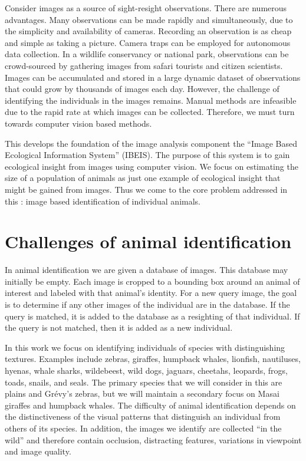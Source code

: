     Consider images as a source of sight-resight observations. There are numerous advantages. Many observations can
    be made rapidly and simultaneously, due to the simplicity and availability of cameras. Recording an observation
    is as cheap and simple as taking a picture. Camera traps can be employed for autonomous data collection. In a
    wildlife conservancy or national park, observations can be crowd-sourced by gathering images from safari
    tourists and citizen scientists. Images can be accumulated and stored in a large dynamic dataset of
    observations that could grow by thousands of images each day. However, the challenge of identifying the
    individuals in the images remains. Manual methods are infeasible due to the rapid rate at which images can be
    collected. Therefore, we must turn towards computer vision based methods.

    This \thesis{} develops the foundation of the image analysis component the ``Image Based Ecological Information
    System'' (IBEIS). The purpose of this system is to gain ecological insight from images using computer vision.
    We focus on estimating the size of a population of animals as just one example of ecological insight that might
    be gained from images. Thus we come to the core problem addressed in this \thesis{}: image based identification
    of individual animals.

\section{Challenges of animal identification}\label{sec:challenges}

    In animal identification we are given a database of images.
    This database may initially be empty.
    Each image is cropped to a bounding box around an animal of interest and labeled with that animal's identity.
    For a new query image, the goal is to determine if any other images of the individual are in the database.
    If the query is matched, it is added to the database as a resighting of that individual.
    If the query is not matched, then it is added as a new individual.

    In this work we focus on identifying individuals of species with distinguishing textures. Examples include
    zebras, giraffes, humpback whales, lionfish, nautiluses, hyenas, whale sharks, wildebeest, wild dogs, jaguars,
    cheetahs, leopards, frogs, toads, snails, and seals. The primary species that we will consider in this
    \thesis{} are plains and Grévy's zebras, but we will maintain a secondary focus on Masai giraffes and humpback
    whales. The difficulty of animal identification depends on the distinctiveness of the visual patterns that
    distinguish an individual from others of its species. In addition, the images we identify are collected ``in
    the wild'' and therefore contain occlusion, distracting features, variations in viewpoint and image quality.

